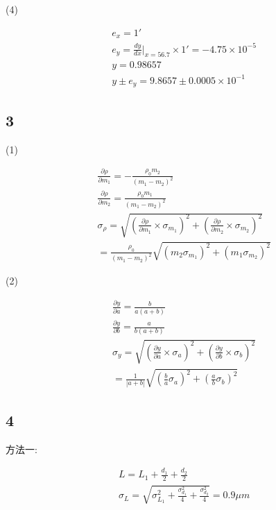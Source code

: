 \documentclass[a4paper,10pt,notitlepage]{report}
\begin{document}
	(4)
	
\begin{align}
	&e_x = 1' \\
	&e_y = \frac{dy}{dx} | _{x = 56.7} \times 1' = -4.75 \times 10^{-5} \\
	&y = 0.98657 \\
	&y \pm e_y = 9.8657 \pm 0.0005 \times 10^{-1}
\end{align}

\subsection*{3}

	(1)

\begin{align}
	&\frac{\partial \rho}{\partial m_1} = - \frac{\rho_0 m_2}{(m_1 - m_2)^2} \\
	&\frac{\partial \rho}{\partial m_2} = \frac{\rho_0 m_1}{(m_1 - m_2)^2} \\
	&\sigma_\rho = \sqrt{(\frac{\partial \rho}{\partial m_1} \times \sigma_{m_1})^2 + (\frac{\partial \rho}{\partial m_2} \times \sigma_{m_2})^2} \\
	&= \frac{\rho_0}{(m_1 - m_2)^2}\sqrt{(m_2 \sigma_{m_1})^2 + (m_1 \sigma_{m_2})^2}
\end{align}

	(2)
	
\begin{align}
	&\frac{\partial y}{\partial a} = \frac{b}{a(a+b)} \\
	&\frac{\partial y}{\partial b} = \frac{a}{b(a+b)} \\
	&\sigma_y = \sqrt{(\frac{\partial y}{\partial a} \times \sigma_a)^2 + (\frac{\partial y}{\partial b} \times \sigma_b)^2} \\
	& = \frac{1}{|a+b|}\sqrt{(\frac{b}{a}\sigma_a)^2 + (\frac{a}{b}\sigma_b)^2}
\end{align}

\subsection*{4}

	方法一:

\begin{align}
	&L = L_1 + \frac{d_1}{2} + \frac{d_2}{2} \\
	&\sigma_L = \sqrt{\sigma_{L_1}^2 + \frac{\sigma_{d_1}^2}{4} + \frac{\sigma_{d_2}^2}{4} } = 0.9 \mu m
\end{align}
\end{document}
